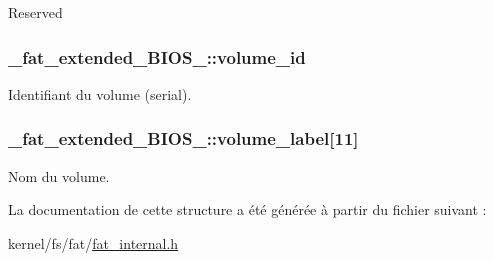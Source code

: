 \-Reserved \hypertarget{struct__fat__extended__BIOS__16_aa932fbe482a2da22749a6f9fa42fce59}{
\subsubsection[{volume\-\_\-id}]{ {\bf \-\_\-fat\-\_\-extended\-\_\-\-B\-I\-O\-S\-\_\-::volume\-\_\-id}}}\label{struct__fat__extended__BIOS__16_aa932fbe482a2da22749a6f9fa42fce59}
\-Identifiant du volume (serial). \hypertarget{struct__fat__extended__BIOS__16_a0f859beb837eb3013ef4ad48dd0c9845}{
\subsubsection[{volume\-\_\-label}]{ {\bf \-\_\-fat\-\_\-extended\-\_\-\-B\-I\-O\-S\-\_\-::volume\-\_\-label}\mbox{[}11\mbox{]}}}\label{struct__fat__extended__BIOS__16_a0f859beb837eb3013ef4ad48dd0c9845}
\-Nom du volume. 

\-La documentation de cette structure a été générée à partir du fichier suivant \-:\begin{DoxyCompactItemize}
\item 
kernel/fs/fat/\hyperlink{fat__internal_8h}{fat\-\_\-internal.\-h}\end{DoxyCompactItemize}
